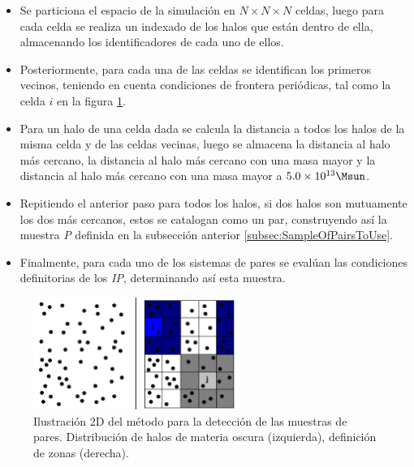 \begin{itemize}
\item Se particiona el espacio de la simulación en $N\times N \times N$
celdas, luego para cada celda se realiza un indexado de los halos que están 
dentro de ella, almacenando los identificadores de cada uno de ellos.

\item Posteriormente, para cada una de las celdas se identifican los 
primeros vecinos, teniendo en cuenta condiciones de frontera periódicas,
tal como la celda $i$ en la figura \ref{fig:Pair_Finder}.

\item Para un halo de una celda dada se calcula la distancia a todos los
halos de la misma celda y de las celdas vecinas, luego se almacena la 
distancia al halo más cercano, la distancia al halo más cercano con una 
masa mayor y la distancia al halo más cercano con una masa mayor a 
$5.0 \times 10^{13}\Msun$.

\item Repitiendo el anterior paso para todos los halos, si dos halos son
mutuamente los dos más cercanos, estos se catalogan como un par, 
construyendo así la muestra \textit{P} definida en la subsección anterior 
\ref{subsec:SampleOfPairsToUse}.

\item Finalmente, para cada uno de los sistemas de pares se evalúan las 
condiciones definitorias de los \textit{IP}, determinando así esta 
muestra.
\end{itemize}


\begin{figure}[htbp]
	\centering
	\includegraphics[width=0.6\textwidth]
	{./figures/3_nbody_simulations/PairFinder.png}

	\caption{\small{Ilustración 2D del método para la detección de las 
	muestras de pares. Distribución de halos de materia oscura (izquierda), 
	definición de zonas (derecha).}}
	\label{fig:Pair_Finder}
\end{figure}


